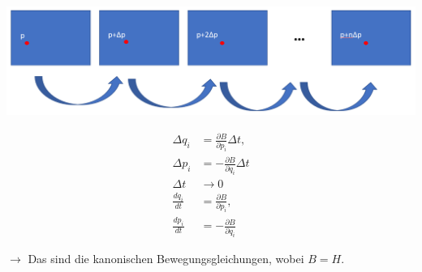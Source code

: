 \begin{frame}
    \hspace*{-2.2cm}\includegraphics[scale=0.322]{images/TransFlow}
\end{frame}

\begin{frame}
    \begin{align*}
    \Delta q_i &= \frac{\partial B}{\partial p_i} \Delta t,\\
    \Delta p_i &= -\frac{\partial B}{\partial q_i} \Delta t \\[5mm]
      \Delta t &\longrightarrow 0 \\[5mm]
    \frac{dq_i}{dt}  &= \frac{\partial B}{\partial p_i},\\
    \frac{dp_i}{dt} &= -\frac{\partial B}{\partial q_i} 
    \end{align*}
    
    \begin{center} $\rightarrow$ Das sind die kanonischen Bewegungsgleichungen, wobei $B=H$. \end{center}

\end{frame}